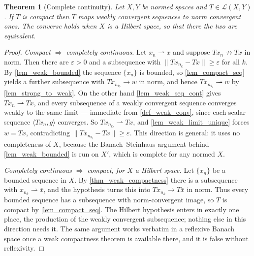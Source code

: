 \documentclass[a4paper]{report}
\theoremstyle{plain}
\newtheorem{theorem}{Theorem}[chapter]
\theoremstyle{definition}
\theoremstyle{remark}
\begin{document}
\begin{theorem}[Complete continuity]
  \label{thm_complete_continuity}
  Let $X,Y$ be normed spaces and $T \in \mathcal{L}(X,Y)$.  If $T$ is compact then $T$
  maps weakly convergent sequences to norm convergent ones.  The converse holds when $X$
  is a Hilbert space, so that there the two are equivalent.
\end{theorem}
\begin{proof}
  \emph{Compact $\Rightarrow$ completely continuous.}  Let $x_n \rightharpoonup x$ and
  suppose $Tx_n \not\to Tx$ in norm.  Then there are $\varepsilon > 0$ and a subsequence
  with $\|Tx_{n_k} - Tx\| \ge \varepsilon$ for all $k$.  By \cref{lem_weak_bounded} the
  sequence $\{x_n\}$ is bounded, so \cref{lem_compact_seq} yields a further subsequence
  with $Tx_{n_{k_l}} \to w$ in norm, and hence $Tx_{n_{k_l}} \rightharpoonup w$ by
  \cref{lem_strong_to_weak}.  On the other hand \cref{lem_weak_seq_cont} gives
  $Tx_n \rightharpoonup Tx$, and every subsequence of a weakly convergent sequence
  converges weakly to the same limit --- immediate from \cref{def_weak_conv}, since each
  scalar sequence $\langle Tx_n,g\rangle$ converges.  So
  $Tx_{n_{k_l}} \rightharpoonup Tx$, and \cref{lem_weak_limit_unique} forces $w = Tx$,
  contradicting $\|Tx_{n_{k_l}} - Tx\| \ge \varepsilon$.  This direction is general: it
  uses no completeness of $X$, because the Banach--Steinhaus argument behind
  \cref{lem_weak_bounded} is run on $X'$, which is complete for any normed $X$.

  \emph{Completely continuous $\Rightarrow$ compact, for $X$ a Hilbert space.}  Let
  $\{x_n\}$ be a bounded sequence in $X$.  By \cref{thm_weak_compactness} there is a
  subsequence with $x_{n_k} \rightharpoonup \bar x$, and the hypothesis turns this into
  $Tx_{n_k} \to T\bar x$ in norm.  Thus every bounded sequence has a subsequence with
  norm-convergent image, so $T$ is compact by \cref{lem_compact_seq}.  The Hilbert
  hypothesis enters in exactly one place, the production of the weakly convergent
  subsequence; nothing else in this direction needs it.  The same argument works verbatim
  in a reflexive Banach space once a weak compactness theorem is available there, and it
  is false without reflexivity.
\end{proof}
\end{document}
